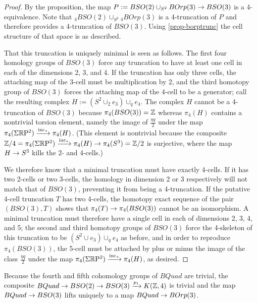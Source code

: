 \documentclass{amsart}
\begin{document}
\begin{proof}
By the proposition, the map $P := BSO(2) \cup_{S^2} BOrp(3) \rightarrow BSO(3)$ is a 4-equivalence.  Note that $_4 BSO(2) \cup_{S^2} {}_4 BOrp(3)$ is a 4-truncation of $P$ and therefore provides a 4-truncation of $BSO(3)$.  Using \cref{prop-borptrunc} the cell structure of that space is as described.  

That this truncation is uniquely minimal is seen as follows.  The first four homology groups of $BSO(3)$ force any truncation to have at least one cell in each of the dimensions 2, 3, and 4.  If the truncation has only three cells, the attaching map of the 3-cell must be multiplication by 2, and the third homotopy group of $BSO(3)$ forces the attaching map of the 4-cell to be a generator; call the resulting complex $H := (S^2 \cup_2 e_3) \cup_q e_4$.  The complex $H$ cannot be a 4-truncation of $BSO(3)$ because $\pi_4(BSO(3)) = \mathbb Z$ whereas $\pi_4(H)$ contains a nontrivial torsion element, namely the image of $\frac{\eta q}{2}$ under the map $\pi_4(\Sigma \mathbb R \mathrm{P}^2) \xrightarrow{\mathrm{inc}_*} \pi_4(H)$.  (This element is nontrivial because the composite $\mathbb Z/4 = \pi_4(\Sigma \mathbb R \mathrm{P}^2) \xrightarrow{\mathrm{inc}_*} \pi_4(H) \rightarrow \pi_4(S^3) = \mathbb Z/2$ is surjective, where the map $H \rightarrow S^3$ kills the 2- and 4-cells.)

We therefore know that a minimal truncation must have exactly 4-cells.  If it has two 2-cells or two 3-cells, the homology in dimension 2 or 3 respectively will not match that of $BSO(3)$, preventing it from being a 4-truncation.  If the putative 4-cell truncation $T$ has two 4-cells, the homotopy exact sequence of the pair $(BSO(3), T)$ shows that $\pi_4(T) \rightarrow \pi_4(BSO(3))$ cannot be an isomorphism.  A minimal truncation must therefore have a single cell in each of dimensions 2, 3, 4, and 5; the second and third homotopy groups of $BSO(3)$ force the 4-skeleton of this truncation to be $(S^2 \cup e_3) \cup_q e_4$ as before, and in order to reproduce $\pi_4(BSO(3))$, the 5-cell must be attached by plus or minus the image of the class $\frac{\eta q}{2}$ under the map $\pi_4(\Sigma \mathbb R \mathrm{P}^2) \xrightarrow{\mathrm{inc}_*} \pi_4(H)$, as desired.  %
\end{proof}

Because the fourth and fifth cohomology groups of $BQuad$ are trivial, the composite $BQuad \rightarrow BSO(2) \rightarrow BSO(3) \xrightarrow{p_1} K(\mathbb Z,4)$ is trivial and the map $BQuad \rightarrow BSO(3)$ lifts uniquely to a map $BQuad \rightarrow BOrp(3)$.
\end{document}
